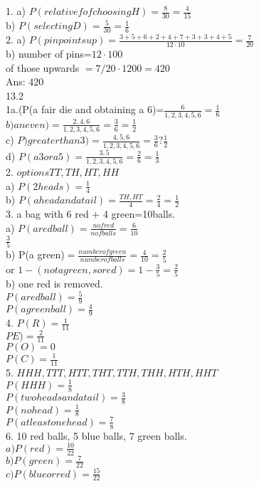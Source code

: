 \documentclass{article}
\begin{document}
  1. a) $P(relative f of choosing H)=\frac{8}{30}=\frac{4}{15}$\\
  b) $P(selecting D)=\frac{5}{30}=\frac{1}{6}$\\
  2. a) $P(pin points up)=\frac{3+5+6+2+4+7+3+3+4+5}{12\cdot 10}=\frac{7}{20}$\\
  b) number of pins=$12\cdot 100$\\
  of those upwards $=7/20\cdot1200=420$\\
  Ans: 420\\
  13.2\\
  1a.(P(a fair die and obtaining a 6)=$\frac{6}{1,2,3,4,5,6}=\frac{1}{6}$\\
  $b) an even)=\frac{2,4,6}{1,2,3,4,5,6}=\frac{3}{6}=\frac{1}{2}$\\
  c) $P)greate rthan 3)=\frac{4,5,6}{1,2,3,4,5,6}=\frac{3}{6}?\frac{1}{2}$\\
  d) $P(a 3 or a 5)=\frac{3,5}{1,2,3,4,5,6}=\displaystyle\frac{2}{6}=\displaystyle\frac{1}{3}$\\
  2. $options TT,TH,HT,HH$\\
  a) $P(2 heads)=\frac{1}{4}$\\
  b) $P(a head and a tail)=\frac{TH,HT}{4}=\frac{2}{4}=\frac{1}{2}$\\
  3. a bag with 6 red + 4 green=10balls.\\
  a) $P(a red ball)=\frac{n of red}{n of balls}=\frac{6}{10}$\\
  $\frac{3}{5}$\\
  b) P(a green)$=\frac{number of green}{number of balls}=\frac{4}{10}=\frac{2}{5}$\\
  or $1-(not a green, so red)=1-\frac{3}{5}=\frac{2}{5}$\\
  b) one red is removed.\\
  $P(a red ball)=\frac{5}{9}$\\
  $P(a green ball)=\frac{4}{9}$\\
  4. $P(R)=\frac{1}{11}$\\
  $P E)=\frac{2}{11}$\\
  $P(O)=0$\\
  $P(C)=\frac{1}{11}$\\
  5. $HHH, TTT, HTT, THT, TTH, THH, HTH, HHT$\\
  $P(HHH)=\frac{1}{8}$\\
  $P(two heads and a tail)=\frac{3}{8}$\\
  $P(no head)=\frac{1}{8}$\\
  $P(atleast one head)=\frac{7}{8}$\\
  6. 10 red balls, 5 blue balls, 7 green balls.\\ 
  $a) P(red)=\frac{10}{22}$\\
  $b) P(green)=\frac{7}{22}$\\
  $c) P(blueorred)=\frac{15}{22}$\\
  

   
\end{document}
